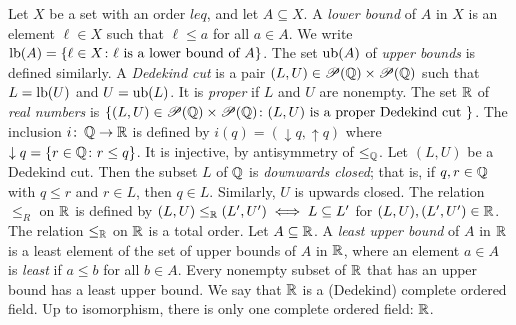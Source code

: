 Let $X$ be a set with an order $leq$, and let $A \subseteq X$. A \textit{lower bound} of $A$ in $X$ is an element $\ell \in X$ such that $\ell \leq a$ for all $a \in A$. We write $\operatorname{lb}(A) = \{ \ell \in X \colon \ell \text{ is a lower bound of } A \}$. The set $\operatorname{ub}(A)$ of \textit{upper bounds} is defined similarly.
 A \textit{Dedekind cut} is a pair $(L, U) \in \operatorname{\mathscr{P}}(\operatorname{\mathbb{Q}}) \times \operatorname{\mathscr{P}}(\operatorname{\mathbb{Q}})$ such that $L = \operatorname{lb}(U)$ and $U = \operatorname{ub}(L)$. It is \textit{proper} if $L$ and $U$ are nonempty.
 The set $\operatorname{\mathbb{R}}$ of \textit{real numbers} is $\{ (L, U) \in \operatorname{\mathscr{P}}(\operatorname{\mathbb{Q}}) \times \operatorname{\mathscr{P}}(\operatorname{\mathbb{Q}}) \colon (L, U) \text{ is a proper Dedekind cut } \}$. The inclusion $i \colon \operatorname{\mathbb{Q}} \to \operatorname{\mathbb{R}}$ is defined by $i(q) = (\downarrow q, \uparrow q)$ where $\downarrow q = \{ r \in \operatorname{\mathbb{Q}} \colon r \leq q \}$. It is injective, by antisymmetry of $\leq_{\operatorname{\mathbb{Q}}}$.
 Let $(L, U)$ be a Dedekind cut. Then the subset $L$ of $\operatorname{\mathbb{Q}}$ is \textit{downwards closed}; that is, if $q, r \in \operatorname{\mathbb{Q}}$ with $q \leq r$ and $r \in L$, then $q \in L$. Similarly, $U$ is upwards closed.
 The relation $\leq_R$ on $\operatorname{\mathbb{R}}$ is defined by $(L, U) \leq_{\operatorname{\mathbb{R}}} (L', U') \iff L \subseteq L'$ for $(L, U), (L', U') \in \operatorname{\mathbb{R}}$.
 The relation $\leq_{\operatorname{\mathbb{R}}}$ on $\operatorname{\mathbb{R}}$ is a total order.
 Let $A \subseteq \operatorname{\mathbb{R}}$. A \textit{least upper bound} of $A$ in $\operatorname{\mathbb{R}}$ is a least element of the set of upper bounds of $A$ in $\operatorname{\mathbb{R}}$, where an element $a \in A$ is \textit{least} if $a \leq b$ for all $b \in A$.
 Every nonempty subset of $\operatorname{\mathbb{R}}$ that has an upper bound has a least upper bound. We say that $\operatorname{\mathbb{R}}$ is a (Dedekind) complete ordered field.
 Up to isomorphism, there is only one complete ordered field: $\operatorname{\mathbb{R}}$.

